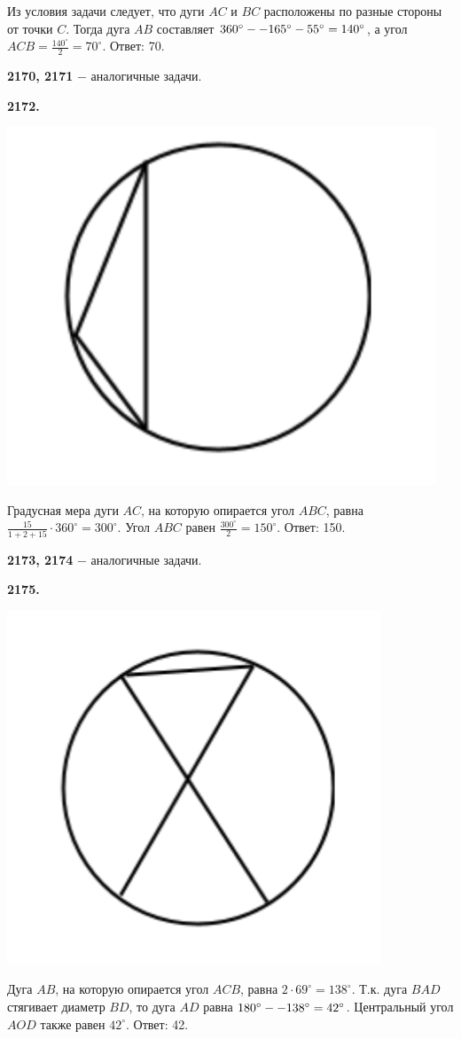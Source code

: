 Из условия задачи следует, что дуги $AC$ и $BC$ расположены по разные стороны от точки $C$. Тогда дуга $AB$ составляет $360^\circ-\linebreak-165^\circ-55^\circ=140^\circ$, а угол $ACB=\frac{140^\circ}{2}=70^\circ$. \newline \null \hspace*{\fill} Ответ: 70.

\textbf{2170, 2171} $-$ аналогичные задачи.

\textbf{2172.}

{\centering \includegraphics[width=0.35\linewidth]{Geometry/Content/46.png}
	
}

Градусная мера дуги $AC$, на которую опирается угол $ABC$, равна
$\frac{15}{1+2+15}\cdot360^\circ=300^\circ$. Угол $ABC$ равен $\frac{300^\circ}{2}=150^\circ$. \newline \null \hspace*{\fill} Ответ: 150.

\textbf{2173, 2174} $-$ аналогичные задачи.

\textbf{2175.}

{\centering \includegraphics[width=0.35\linewidth]{Geometry/Content/47.png}
	
}

Дуга $AB$, на которую опирается угол $ACB$, равна $2\cdot69^\circ=138^\circ$. Т.к. дуга $BAD$ стягивает диаметр $BD$, то дуга $AD$ равна $180^\circ-\linebreak-138^\circ=42^\circ$. Центральный угол $AOD$ также равен $42^\circ$. \newline \null \hspace*{\fill} Ответ: 42.

